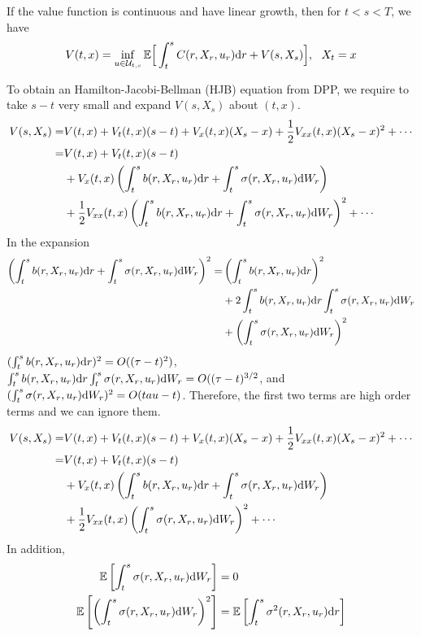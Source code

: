 \documentclass[11pt]{book}
\newcommand{\dr}{\text{\normalfont d}r}
\newcommand{\dW}{\text{\normalfont d}W}
\begin{document}
\begin{thm}\label{thm:stoch_dpp_no_stopping}
    If the value function is continuous and have linear growth, then for $t<s<T$, we have 
    \begin{equation}\label{eqn:stoch_dpp_no_stopping}
        V(t,x)= \inf_{u\in\mathcal{U}_{t,s}}\mathbb{E}\Big[\int_t^s C(r,X_r,u_r){\dr} + V(s,X_s)\Big],~~X_t=x
    \end{equation}
\end{thm}
To obtain an Hamilton-Jacobi-Bellman (HJB) equation from DPP, we require to take $s-t$ very small and expand $V(s,X_s)$ about $(t,x)$.
\[
\begin{split}
    V(s,X_s)  = & V(t,x) + V_t(t,x)(s-t) +V_x(t,x)(X_s-x) + \frac12 V_{xx}(t,x)(X_s-x)^2 + \cdots\\
     =&V(t,x) + V_t(t,x)(s-t) \\
     &+V_x(t,x)\left(\int_t^s b(r,X_r,u_r)\dr +\int_t^s \sigma(r,X_r,u_r)\dW_r\right) \\
     &+ \frac12 V_{xx}(t,x)\left(\int_t^s b(r,X_r,u_r)\dr +\int_t^s\sigma(r,X_r,u_r)\dW_r\right)^2 + \cdots
\end{split}
\]
In the expansion
\[
\begin{split}
    \left(\int_t^s  b(r,X_r,u_r)\dr +\int_t^s  \sigma(r,X_r,u_r)\dW_r\right)^2 = &\left(\int_t^s  b(r,X_r,u_r)\dr\right)^2 \\
    &+2\int_t^s  b(r,X_r,u_r)\dr\int_t^s  \sigma(r,X_r,u_r)\dW_r\\
    &+\left(\int_t^s  \sigma(r,X_r,u_r)\dW_r\right)^2
\end{split}
\]
$(\int_t^s  b(r,X_r,u_r)\dr)^2=O((\tau-t)^2)$, $\int_t^s  b(r,X_r,u_r)\dr\int_t^s  \sigma(r,X_r,u_r)\dW_r=O((\tau-t)^{3/2}$, and $(\int_t^s  \sigma(r,X_r,u_r)\dW_r)^2=O(tau-t)$. Therefore, the first two terms are high order terms and we can ignore them. 
\[
\begin{split}
    V(s,X_s)  = & V(t,x) + V_t(t,x)(s-t) +V_x(t,x)(X_s-x) + \frac12 V_{xx}(t,x)(X_s-x)^2 + \cdots\\
     =&V(t,x) + V_t(t,x)(s-t) \\
     &+V_x(t,x)\left(\int_t^s  b(r,X_r,u_r)\dr +\int_t^s  \sigma(r,X_r,u_r)\dW_r\right) \\
     &+ \frac12 V_{xx}(t,x)\left(\int_t^s  \sigma(r,X_r,u_r)\dW_r\right)^2 + \cdots
\end{split}
\]
In addition, 
\begin{align}
    \mathbb{E}\left[\int_t^s  \sigma(r,X_r,u_r)\dW_r\right]&=0\label{dpp:mean_zero}\\
    \mathbb{E}\left[\left(\int_t^s  \sigma(r,X_r,u_r)\dW_r\right)^2\right]&=\mathbb{E}\left[\int_t^s  \sigma^2(r,X_r,u_r)\dr\right]\label{dpp:variance}
\end{align}
\end{document}
